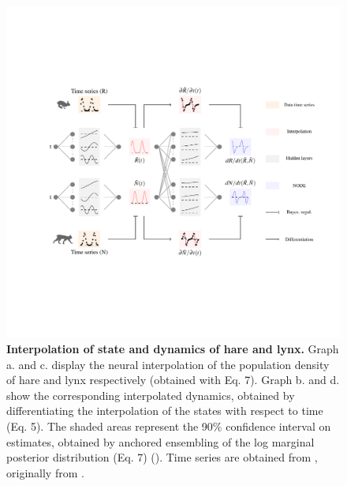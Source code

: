 \documentclass[11pt, oneside]{article}
\begin{document}
\begin{figure}[H]
\includegraphics[width=1\linewidth,page=23]{figures/main.pdf}
\caption{
    \textbf{Interpolation of state and dynamics of hare and lynx.}
    Graph a. and c. display the neural interpolation of the population density of hare and lynx respectively (obtained with Eq. 7). 
    Graph b. and d. show the corresponding interpolated dynamics, obtained by differentiating the interpolation of the states with respect to time (Eq. 5).
    The shaded areas represent the 90\% confidence interval on estimates, obtained by anchored ensembling of the log marginal posterior distribution (Eq. 7) (\cite{Pearce2018}).
    Time series are obtained from \cite{Bonnaffe2021a}, originally from \cite{Odum1972}.
}
\end{figure}
\newpage
\end{document}
